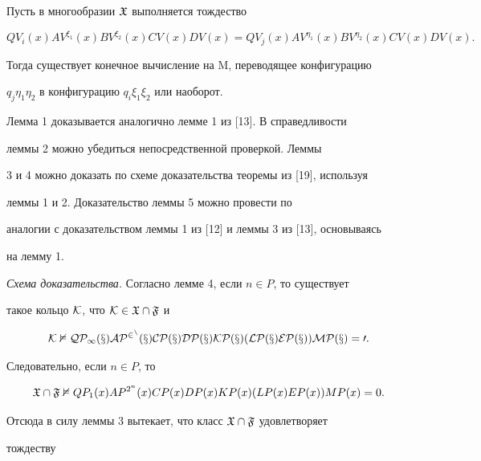 \begin{lem} 


Пусть в многообразии $\frak X$ выполняется тождество 


$$ 


QV_i(x)AV^{\xi_1}(x)BV^{\xi_2}(x)CV(x)DV(x)= 


QV_j(x)AV^{\eta_1}(x)BV^{\eta_2}(x)CV(x)DV(x). 


$$ 


Тогда существует конечное вычисление на $\mathrm M$, переводящее конфигурацию 


$q_j\eta_1\eta_2$ в конфигурацию $q_i\xi_1\xi_2$ или наоборот. 


\end{lem} 


 


Лемма 1 доказывается аналогично лемме 1 из [13]. В справедливости 


леммы 2 можно убедиться непосредственной проверкой. Леммы 


3 и 4 можно доказать по схеме доказательства теоремы из [19], используя 


леммы 1 и 2. Доказательство леммы 5 можно провести по 


аналогии с доказательством леммы 1 из [12] и леммы 3 из [13], основываясь 


на лемму 1. 


\medskip 


 


{\it Схема доказательства.} Согласно лемме 4, если $n\in P$, то существует 


такое кольцо $\cal K$, что $\cal K\in\frak X\cap\frak F$ и 


$$ 


\cal K\nvDash QP_1(x)AP^{2^n}(x)CP(x)DP(x)KP(x) 


(LP(x)EP(x))MP(x)=0. 


$$ 


Следовательно, если $n\in P$, то 


$$ 


\frak X\cap\frak F\nvDash QP_1(x)AP^{2^n}(x)CP(x)DP(x)KP(x) 


(LP(x)EP(x))MP(x)=0. 


$$ 


Отсюда в силу леммы 3 вытекает, что класс $\frak X\cap\frak F$ удовлетворяет 


тождеству 


$$ 


